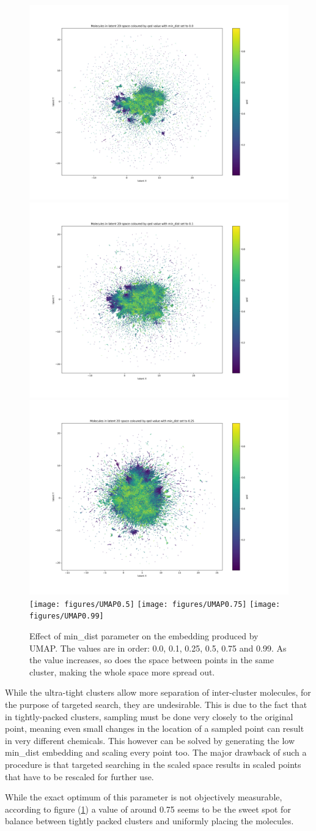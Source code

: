 \begin{figure}[!h]
	\centering
	\includegraphics[width=0.32\columnwidth]{figures/UMAP0.0}
	\includegraphics[width=0.32\columnwidth]{figures/UMAP0.1}
	\includegraphics[width=0.32\columnwidth]{figures/UMAP0.25}
	\texttt{[image: figures/UMAP0.5]}
	\texttt{[image: figures/UMAP0.75]}
	\texttt{[image: figures/UMAP0.99]}
	\caption{Effect of min\_dist parameter on the embedding produced by UMAP. The values are in order: 0.0, 0.1, 0.25, 0.5, 0.75 and 0.99. As the value increases, so does the space between points in the same cluster, making the whole space more spread out.}
	\label{fig:umap:min_dist}
\end{figure}

While the ultra-tight clusters allow more separation of inter-cluster molecules, for the purpose of targeted search, they are undesirable. This is due to the fact that in tightly-packed clusters, sampling must be done very closely to the original point, meaning even small changes in the location of a sampled point can result in very different chemicals. This however can be solved by generating the low min\_dist embedding and scaling every point too. The major drawback of such a procedure is that targeted searching in the scaled space results in scaled points that have to be rescaled for further use. 

While the exact optimum of this parameter is not objectively measurable, according to figure (\ref{fig:umap:min_dist}) a value of around 0.75 seems to be the sweet spot for balance between tightly packed clusters and uniformly placing the molecules. 

